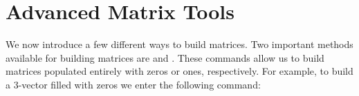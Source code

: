 	
\section*{Advanced Matrix Tools}

We now introduce a few different ways to build matrices. Two important methods available for building matrices are  and . These commands allow us to build matrices populated entirely with zeros or ones, respectively. For example, to build a 3-vector filled with zeros we enter the following command:

